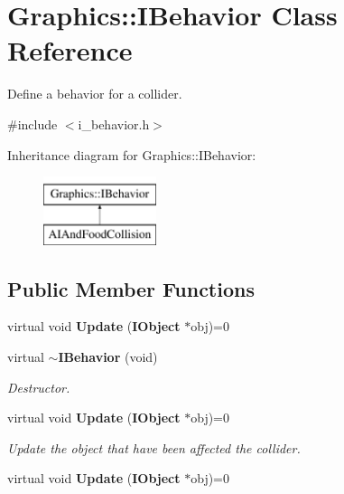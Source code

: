 \section{Graphics\+:\+:I\+Behavior Class Reference}
\label{class_graphics_1_1_i_behavior}


Define a behavior for a collider.  




{\ttfamily \#include $<$i\+\_\+behavior.\+h$>$}

Inheritance diagram for Graphics\+:\+:I\+Behavior\+:\begin{figure}[H]
\begin{center}
\leavevmode
\includegraphics[height=2.000000cm]{class_graphics_1_1_i_behavior}
\end{center}
\end{figure}
\subsection*{Public Member Functions}
\begin{DoxyCompactItemize}
\item 
virtual void {\bfseries Update} ({\bf I\+Object} $\ast$obj)=0\label{class_graphics_1_1_i_behavior_ac341180608014d8ec54c2b775881c191}

\item 
virtual {\bf $\sim$\+I\+Behavior} (void)\label{class_graphics_1_1_i_behavior_a7b7335a435db0c76fc0b596792d3a905}

\begin{DoxyCompactList}\small\item\em Destructor. \end{DoxyCompactList}\item 
virtual void {\bf Update} ({\bf I\+Object} $\ast$obj)=0
\begin{DoxyCompactList}\small\item\em Update the object that have been affected the collider. \end{DoxyCompactList}\item 
virtual void {\bfseries Update} ({\bf I\+Object} $\ast$obj)=0\label{class_graphics_1_1_i_behavior_ac341180608014d8ec54c2b775881c191}

\end{DoxyCompactItemize}


